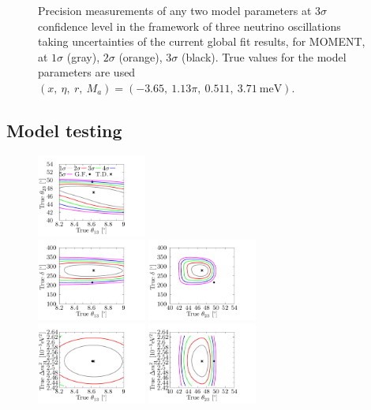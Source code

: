 \documentclass[a4paper,11pt]{article}
\begin{document}
\begin{figure}[!h]
 \caption{\label{fig:model_2D}Precision measurements of any two model parameters at 3$\sigma$ confidence level in the framework of three neutrino oscillations taking uncertainties of the current global fit results, for MOMENT, at $1\sigma$ (gray), $2\sigma$ (orange), $3\sigma$ (black). True values for the model parameters are used $(x,~\eta,~r,~M_a)=(-3.65,~1.13\pi,~0.511,~3.71~\text{meV})$.}
\end{figure}


\subsection{Model testing}

\begin{figure}[!h]
 \flushleft
%
\includegraphics[width=0.32\textwidth]{figs/SR_th13_th23.pdf}$~~~~~~$\\
\includegraphics[width=0.32\textwidth]{figs/SR_th13_dCP.pdf}
\includegraphics[width=0.32\textwidth]{figs/SR_th23_dCP.pdf}$~~~~~~$\\
\includegraphics[width=0.32\textwidth]{figs/SR_th13_ldm.pdf}
\includegraphics[width=0.32\textwidth]{figs/SR_th23_ldm.pdf}

\end{figure}
\end{document}
